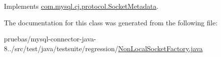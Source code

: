 Implements \mbox{\hyperlink{interfacecom_1_1mysql_1_1cj_1_1protocol_1_1_socket_metadata_ae786655db2998b2391b183fdad43e02c}{com.\+mysql.\+cj.\+protocol.\+Socket\+Metadata}}.



The documentation for this class was generated from the following file\+:\begin{DoxyCompactItemize}
\item 
pruebas/mysql-\/connector-\/java-\/8../src/test/java/testsuite/regression/\mbox{\hyperlink{_non_local_socket_factory_8java}{Non\+Local\+Socket\+Factory.\+java}}\end{DoxyCompactItemize}
